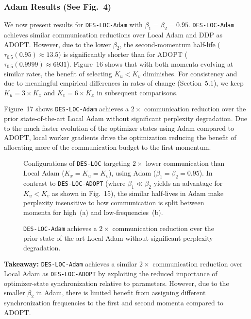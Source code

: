 \subsubsection{Adam Results (See Fig.~4)}
\label{sec:b34_adam_fig4}

We now present results for \texttt{DES-LOC-Adam} with $\beta_1=\beta_2=0.95$. \texttt{DES-LOC-Adam} achieves similar communication reductions over Local Adam and DDP as ADOPT. However, due to the lower $\beta_2$, the second-momentum half-life ($\tau_{0.5}(0.95)\approx 13.5$) is significantly shorter than for ADOPT ($\tau_{0.5}(0.9999)\approx 6931$). Figure~16 shows that with both momenta evolving at similar rates, the benefit of selecting $K_u < K_v$ diminishes. For consistency and due to meaningful empirical differences in rates of change (Section~5.1), we keep $K_u=3\times K_x$ and $K_v=6\times K_x$ in subsequent comparisons.

Figure~17 shows \texttt{DES-LOC-Adam} achieves a $2\times$ communication reduction over the prior state-of-the-art Local Adam \citep{Cheng2025} without significant perplexity degradation. Due to the much faster evolution of the optimizer states using Adam compared to ADOPT, local worker gradients drive the optimization reducing the benefit of allocating more of the communication budget to the first momentum.

\begin{figure}[ht]
\centering
\caption{Configurations of \texttt{DES-LOC} targeting $2\times$ lower communication than Local Adam ($K_x=K_u=K_v$), using Adam ($\beta_1=\beta_2=0.95$). In contrast to \texttt{DES-LOC-ADOPT} (where $\beta_1 \ll \beta_2$ yields an advantage for $K_u < K_v$ as shown in Fig.~15), the similar half-lives in Adam make perplexity insensitive to how communication is split between momenta for high~(a) and low-frequencies~(b).}
\label{fig:16}
\end{figure}

\begin{figure}[ht]
\centering
\caption{\texttt{DES-LOC-Adam} achieves a $2\times$ communication reduction over the prior state-of-the-art Local Adam without significant perplexity degradation.}
\label{fig:17}
\end{figure}

\textbf{Takeaway:} \texttt{DES-LOC-Adam} achieves a similar $2\times$ communication reduction over Local Adam as \texttt{DES-LOC-ADOPT} by exploiting the reduced importance of optimizer-state synchronization relative to parameters. However, due to the smaller $\beta_2$ in Adam, there is limited benefit from assigning different synchronization frequencies to the first and second momenta compared to ADOPT.

